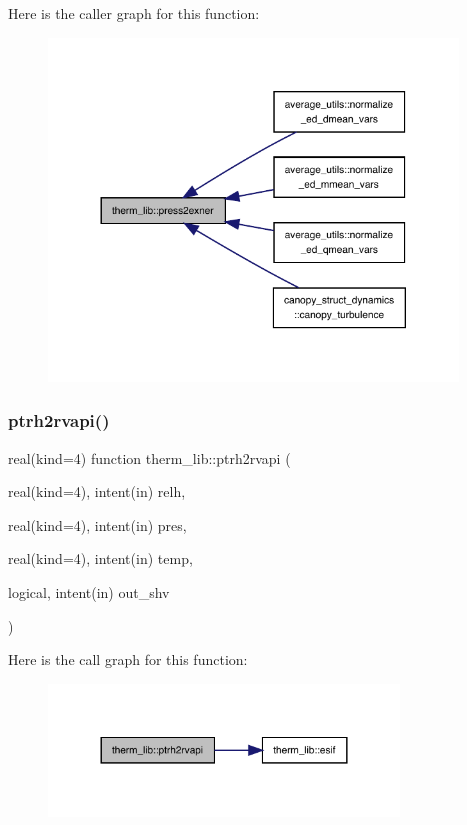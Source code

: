 Here is the caller graph for this function\+:
\nopagebreak
\begin{figure}[H]
\begin{center}
\leavevmode
\includegraphics[width=308pt]{namespacetherm__lib_a4e2091a1a5d89a568a252369122ecb39_icgraph}
\end{center}
\end{figure}
\mbox{\label{namespacetherm__lib_ac6a566c85228fe3eb44352086e7b22e2}} 
\subsubsection{\texorpdfstring{ptrh2rvapi()}{ptrh2rvapi()}}
{\footnotesize\ttfamily real(kind=4) function therm\+\_\+lib\+::ptrh2rvapi (\begin{DoxyParamCaption}\item[{real(kind=4), intent(in)}]{relh,  }\item[{real(kind=4), intent(in)}]{pres,  }\item[{real(kind=4), intent(in)}]{temp,  }\item[{logical, intent(in)}]{out\+\_\+shv }\end{DoxyParamCaption})}

Here is the call graph for this function\+:
\nopagebreak
\begin{figure}[H]
\begin{center}
\leavevmode
\includegraphics[width=264pt]{namespacetherm__lib_ac6a566c85228fe3eb44352086e7b22e2_cgraph}
\end{center}
\end{figure}
\mbox{\label{namespacetherm__lib_a0b228d623c4a7506f51e5ffb0af0652f}} 
